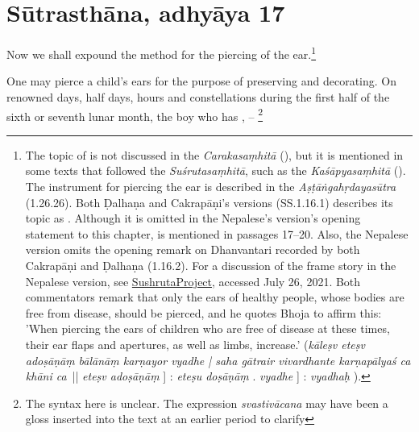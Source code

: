 \section{Sūtrasthāna, adhyāya 17}

\begin{translation}    
    
    \item [1] Now we shall expound the method for
    the piercing of the ear.\footnote{The topic of   is not discussed in the \emph{Carakasaṃhitā} (\cite[IB, 326, n.\,175]{meul-hist}), but it is mentioned in some texts that followed the \emph{Suśrutasaṃhitā}, such as the \emph{Kaśāpyasaṃhitā} (\cite[IIA, 30]{meul-hist}). The instrument for piercing the ear is described in the \emph{Aṣṭāṅgahṛdayasūtra} (1.26.26). Both Ḍalhaṇa and Cakrapāṇi's versions (SS.1.16.1) describes its topic as . Although it is omitted in the Nepalese's version's opening statement to this chapter,  is mentioned in passages 17–20. Also, the Nepalese version omits the opening remark on Dhanvantari recorded by both Cakrapāṇi and Ḍalhaṇa (1.16.2). For a discussion of the frame story in the Nepalese version, see \href{sushrutaproject.org/2021/07/11/dhanvantari2/}{SushrutaProject}, accessed July 26, 2021. Both commentators remark that only the ears of healthy people, whose bodies are free from disease, should be pierced, and he quotes Bhoja to affirm this: 'When piercing the ears of children who are free of disease at these times, their ear flaps and apertures, as well as limbs, increase.'  (\emph{kāleṣv eteṣv adoṣāṇāṃ bālānāṃ karṇayor vyadhe | saha gātrair vivardhante karṇapālyaś ca khāni ca}~|| \emph{eteṣv adoṣāṇāṃ} ] \cite[16.2]{acar-1938} : \emph{eteṣu doṣāṇāṃ} \cite[16.2]{acar-1939}. \emph{vyadhe} ] \cite[16.2]{acar-1938} : \emph{vyadhaḥ} \cite[16.2]{acar-1939}).}
    \item [2] One may pierce a child's ears for the purpose of preserving and 
    decorating. On renowned days, half days, hours and constellations during the first half of the sixth or seventh lunar month, the boy who has , -- \footnote{The
    syntax here is unclear. The expression \emph{svastivācana} may have been
    a gloss inserted into the text at an earlier period to clarify
}
\end{translation}
